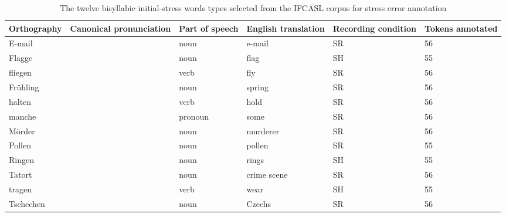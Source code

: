 	\begin{table}[htb]
		\centering
		\caption{The twelve bisyllabic initial-stress words types selected from the IFCASL corpus for stress error annotation %
		}
		
		\begin{tabularx}{\textwidth}{lXXXXX}
		\toprule
		
		Orthography & 
		Canonical \linebreak pronunciation & 
		Part of speech & 
		English \linebreak translation & 
		Recording condition & 
		Tokens \linebreak annotated\\
		
		\midrule
		E-mail	&	\TODO{prons} &	noun &	e-mail &	SR 	&	56	\\
		Flagge	&	&	noun &	 flag &	SH	&	55	\\
		fliegen	&	&	verb &	fly &	SR		& 56	\\
		Frühling	&	& noun	&	spring &	SR		&	56	\\
		halten	&	&	verb &	hold &	SR 	&	56	\\
		manche	&	&	pronoun &	some & 	SR 	&	56	\\
		Mörder	&	&	noun &	murderer &	SR 	&	56	\\
		Pollen	&	&	noun &	pollen &	SR 	& 	55	\\
		Ringen	&	&	noun &	rings &	SH	&	55	\\
		Tatort	&	&	noun &	crime scene & 	SR 	&		56	\\
		tragen	&	&	verb &	wear &	SH	&	55	\\
		Tschechen	&	& noun	&	Czechs	&	SR		& 56	\\
		\bottomrule
		\end{tabularx}
		\label{tab:bisyllwords}
	\end{table}

